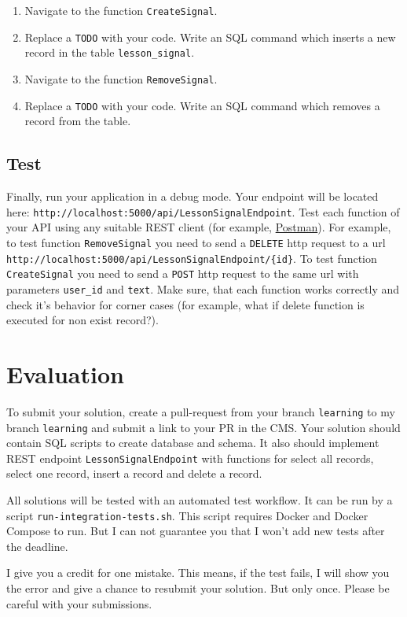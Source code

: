 \documentclass[12pt]{article}
\newcommand{\code}[1]{\texttt{#1}}
\begin{document}
\begin{enumerate}
\item Navigate to the function \code{CreateSignal}.
\item Replace a \code{TODO} with your code. Write an SQL command which inserts a new record in the table \code{lesson\_signal}.
\item Navigate to the function \code{RemoveSignal}.
\item Replace a \code{TODO} with your code. Write an SQL command which removes a record from the table.
\end{enumerate}

\subsection*{Test}

Finally, run your application in a debug mode. Your endpoint will be located here: \code{http://localhost:5000/api/LessonSignalEndpoint}. Test each function of your API using any suitable REST client (for example, \href{https://www.getpostman.com/}{Postman}). For example, to test function \code{RemoveSignal} you need to send a \code{DELETE} http request to a url \code{http://localhost:5000/api/LessonSignalEndpoint/\{id\}}. To test function \code{CreateSignal} you need to send a \code{POST} http request to the same url with parameters \code{user\_id} and \code{text}. Make sure, that each function works correctly and check it's behavior for corner cases (for example, what if delete function is executed for non exist record?).

\section*{Evaluation}
To submit your solution, create a pull-request from your branch \code{learning} to my branch \code{learning} and submit a link to your PR in the CMS. Your solution should contain SQL scripts to create database and schema. It also should implement REST endpoint \code{LessonSignalEndpoint} with functions for select all records, select one record, insert a record and delete a record.

All solutions will be tested with an automated test workflow. It can be run by a script \code{run-integration-tests.sh}. This script requires Docker and Docker Compose to run. But I can not guarantee you that I won't add new tests after the deadline.

I give you a credit for one mistake. This means, if the test fails, I will show you the error and give a chance to resubmit your solution. But only once. Please be careful with your submissions.
\end{document}
